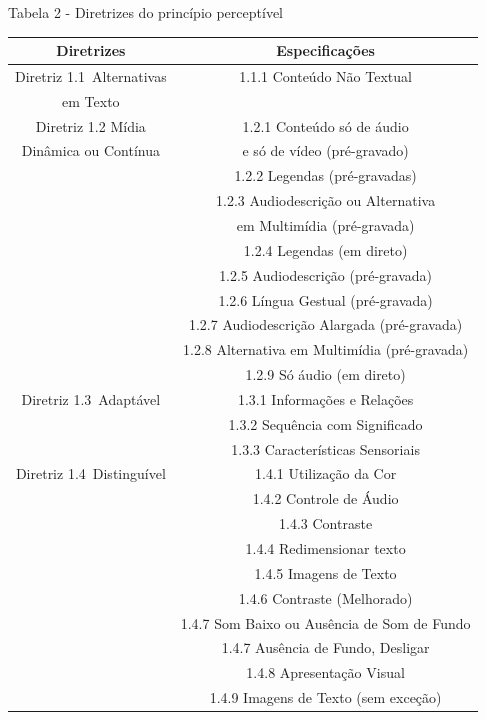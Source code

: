 \documentclass[a4paper]{article}
\begin{document}
\begin{titlepage}
Tabela 2 - Diretrizes do princípio perceptível\\
\begin{center}
	\fontsize{8pt}{8pt}\selectfont
	\begin{tabular}{|cc|}
		\hline
		Diretrizes & Especificações \\
		\hline
		Diretriz 1.1 Alternativas& 1.1.1 Conteúdo Não Textual\\
		em Texto & \\
		\hline
		Diretriz 1.2 Mídia & 1.2.1 Conteúdo só de áudio\\
		Dinâmica ou Contínua & e só de vídeo (pré-gravado) \\
		& 1.2.2 Legendas (pré-gravadas)\\
		& 1.2.3 Audiodescrição ou Alternativa\\
		& em Multimídia (pré-gravada)\\
		& 1.2.4 Legendas (em direto)\\
		& 1.2.5 Audiodescrição (pré-gravada)\\
		& 1.2.6 Língua Gestual (pré-gravada)\\
		& 1.2.7 Audiodescrição Alargada (pré-gravada)\\
		& 1.2.8 Alternativa em Multimídia (pré-gravada)\\
		& 1.2.9 Só áudio (em direto)\\
		\hline
		Diretriz 1.3 Adaptável& 1.3.1 Informações e Relações\\
		& 1.3.2 Sequência com Significado\\
		& 1.3.3 Características Sensoriais\\
		\hline
		Diretriz 1.4 Distinguível& 1.4.1 Utilização da Cor\\
		& 1.4.2 Controle de Áudio\\
		& 1.4.3 Contraste\\
		& 1.4.4 Redimensionar texto\\
		& 1.4.5 Imagens de Texto\\
		& 1.4.6 Contraste (Melhorado)\\
		& 1.4.7 Som Baixo ou Ausência de Som de Fundo\\
		& 1.4.7 Ausência de Fundo, Desligar\\
		& 1.4.8 Apresentação Visual\\
		& 1.4.9 Imagens de Texto (sem exceção)\\
		\hline
	\end{tabular}
\end{center}


\end{titlepage}
\end{document}
